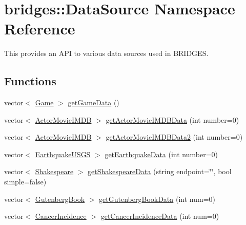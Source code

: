 \hypertarget{namespacebridges_1_1_data_source}{}\section{bridges\+:\+:Data\+Source Namespace Reference}
\label{namespacebridges_1_1_data_source}


This provides an A\+P\+I to various data sources used in B\+R\+I\+D\+G\+E\+S.  


\subsection*{Functions}
\begin{DoxyCompactItemize}
\item 
vector$<$ \hyperlink{classbridges_1_1_game}{Game} $>$ \hyperlink{namespacebridges_1_1_data_source_a96a28cc7f2a6013fe09b07cc53c7432f}{get\+Game\+Data} ()
\item 
vector$<$ \hyperlink{classbridges_1_1_actor_movie_i_m_d_b}{Actor\+Movie\+I\+M\+D\+B} $>$ \hyperlink{namespacebridges_1_1_data_source_ac43ccd8f2a325cf2f057a5ee7f0b73f1}{get\+Actor\+Movie\+I\+M\+D\+B\+Data} (int number=0)
\item 
vector$<$ \hyperlink{classbridges_1_1_actor_movie_i_m_d_b}{Actor\+Movie\+I\+M\+D\+B} $>$ \hyperlink{namespacebridges_1_1_data_source_a436c584d3672c9800a3271ad7641ad59}{get\+Actor\+Movie\+I\+M\+D\+B\+Data2} (int number=0)
\item 
vector$<$ \hyperlink{classbridges_1_1_earthquake_u_s_g_s}{Earthquake\+U\+S\+G\+S} $>$ \hyperlink{namespacebridges_1_1_data_source_a2af96553650d859b102f179b3db55389}{get\+Earthquake\+Data} (int number=0)
\item 
vector$<$ \hyperlink{classbridges_1_1_shakespeare}{Shakespeare} $>$ \hyperlink{namespacebridges_1_1_data_source_abdf2e4d709e9b7f1a5370726676d86ec}{get\+Shakespeare\+Data} (string endpoint=\char`\"{}\char`\"{}, bool simple=false)
\item 
vector$<$ \hyperlink{classbridges_1_1_gutenberg_book}{Gutenberg\+Book} $>$ \hyperlink{namespacebridges_1_1_data_source_a8146b00565286727e8206e377d9ff5bd}{get\+Gutenberg\+Book\+Data} (int num=0)
\item 
vector$<$ \hyperlink{classbridges_1_1_cancer_incidence}{Cancer\+Incidence} $>$ \hyperlink{namespacebridges_1_1_data_source_a4f8990ea0e793a6464d95cb82f57c8f9}{get\+Cancer\+Incidence\+Data} (int num=0)
\end{DoxyCompactItemize}



